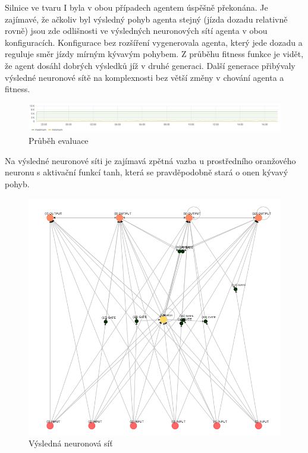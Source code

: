 Silnice ve tvaru I byla v obou případech agentem úspěšně překonána. Je zajímavé, že ačkoliv byl výsledný pohyb agenta stejný (jízda dozadu relativně rovně) jsou zde odlišnosti ve výsledných neuronových sítí agenta v obou konfiguracích.
Konfigurace bez rozšíření vygenerovala agenta, který jede dozadu a reguluje směr jízdy mírným kývavým pohybem. 
Z průběhu fitness funkce je vidět, že agent dosáhl dobrých výsledků jíž v druhé generaci. Další generace přibývaly výsledné neuronové sítě na komplexnosti bez větší změny v chování agenta a fitness.
\begin{figure}[H]
	\centering
	\includegraphics[width=1.0\linewidth]{solutions/Ibasic/basicGraph}
	\caption{Průběh evaluace}
	\label{fig:basicgraph}
\end{figure}
Na výsledné neuronové síti je zajímavá zpětná vazba u prostředního oranžového neuronu s aktivační funkcí tanh, která se pravděpodobně stará o onen kývavý pohyb.
\begin{figure}[H]
	\centering
	\includegraphics[width=0.6\linewidth]{solutions/Ibasic/basic}
	\caption{Výsledná neuronová síť}
	\label{fig:basic}
\end{figure}

